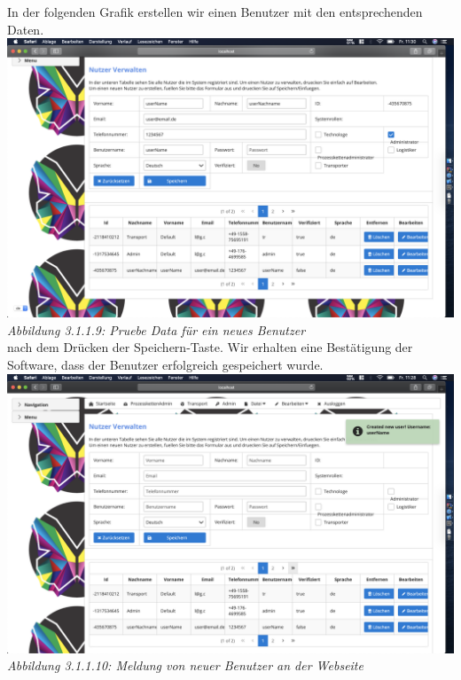 \documentclass[enabledeprecatedfontcommands,fontsize=12pt,paper=a4,twoside]{scrartcl}
\begin{document}
In der folgenden Grafik erstellen wir einen Benutzer mit den entsprechenden Daten.
\hypertarget{sc3.1.2.2}{
\includegraphics[width=1\textwidth]{Screenshots/userErzeugungInitialData.png}
\textit{Abbildung 3.1.1.9: Pruebe Data für ein neues Benutzer}
} \\
nach dem Drücken der Speichern-Taste. Wir erhalten eine Bestätigung der Software, dass der Benutzer erfolgreich gespeichert wurde.
\hypertarget{sc3.1.2.3}{
\includegraphics[width=1\textwidth]{Screenshots/userErzeugenMeldung.png}
\textit{Abbildung 3.1.1.10: Meldung von neuer Benutzer an der Webseite}
} \\
\end{document}
